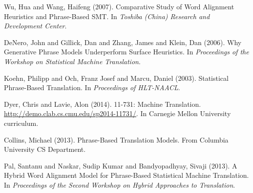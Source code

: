 \documentclass[twocolumn]{article}
\begin{document}
\begin{thebibliography}{99}
    Wu, Hua and Wang, Haifeng
    (2007).
    Comparative Study of Word Alignment Heuristics and Phrase-Based SMT.
    In \emph{Toshiba (China) Research and
      Development Center}.

    DeNero, John and Gillick, Dan and Zhang, James and Klein, Dan
    (2006).
    Why Generative Phrase Models Underperform Surface Heuristics.
    In \emph{Proceedings of the Workshop on Statistical Machine Translation}.

    Koehn, Philipp and Och, Franz Josef and Marcu, Daniel
    (2003).
    Statistical Phrase-Based Translation.
    In \emph{Proceedings of HLT-NAACL}.

    Dyer, Chris and Lavie, Alon
    (2014).
    11-731: Machine Translation.
    \href{http://demo.clab.cs.cmu.edu/sp2014-11731/}
     {\underline{http://demo.clab.cs.cmu.edu/sp2014-11731/}}.
    In Carnegie Mellon University curriculum.

    Collins, Michael
    (2013).
    Phrase-Based Translation Models.
    From Columbia University CS Department.

    Pal, Santanu and Naskar, Sudip Kumar and Bandyopadhyay, Sivaji
    (2013).
    A Hybrid Word Alignment Model for Phrase-Based Statistical Machine
    Translation.
    In \emph{Proceedings of the Second Workshop on Hybrid Approaches to
      Translation}.
\end{thebibliography}
\end{document}
